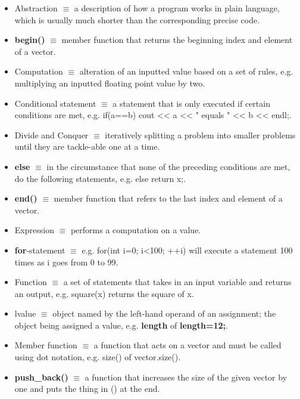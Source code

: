 \documentclass[12pt]{article}
\begin{document}
\begin{itemize}
\item Abstraction $\equiv$ a description of how a program works in plain language, which is usually much shorter than the corresponding precise code.

\item \textbf{begin()} $\equiv$ member function that returns the beginning index and element of a vector.

\item Computation $\equiv$ alteration of an inputted value based on a set of rules, e.g. multiplying an inputted floating point value by two.

\item Conditional statement $\equiv$ a statement that is only executed if certain conditions are met, e.g. if(a==b) cout << a << " equals " << b << endl;.

\item Divide and Conquer $\equiv$ iteratively splitting a problem into smaller problems until they are tackle-able one at a time.

\item \textbf{else} $\equiv$ in the circumstance that none of the preceding conditions are met, do the following statements, e.g. else return x;.

\item \textbf{end()} $\equiv$ member function that refers to the last index and element of a vector.

\item Expression $\equiv$ performs a computation on a value.

\item \textbf{for}-statement $\equiv$ e.g. for(int i=0; i<100; ++i) will execute a statement 100 times as i goes from 0 to 99.

\item Function $\equiv$ a set of statements that takes in an input variable and returns an output, e.g. square(x) returns the square of x.

\item lvalue $\equiv$ object named by the left-hand operand of an assignment; the object being assigned a value, e.g. \textbf{length} of \textbf{length=12;}.

\item Member function $\equiv$ a function that acts on a vector and must be called using dot notation, e.g. size() of vector.size().

\item \textbf{push\_back()} $\equiv$ a function that increases the size of the given vector by one and puts the thing in () at the end.


\end{itemize}
\end{document}
